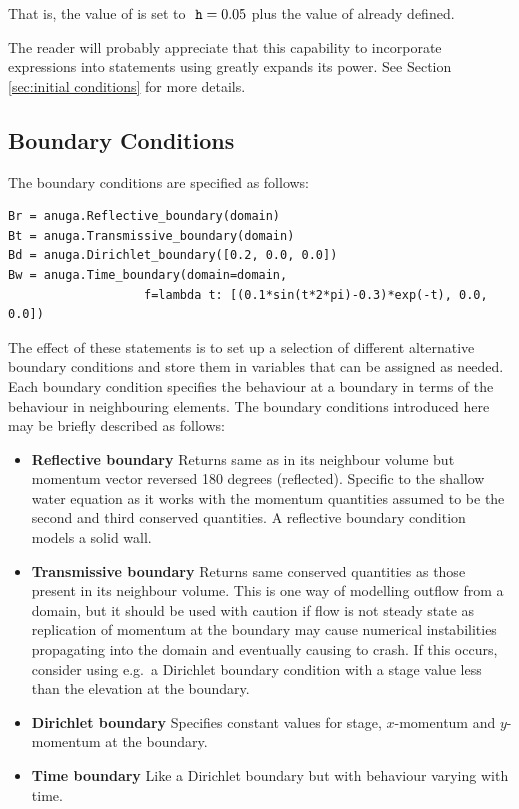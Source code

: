 \documentclass{manual}
\begin{document}
That is, the value of  is set to $\code{h} = 0.05$ plus
the value of  already defined.

The reader will probably appreciate that this capability to
incorporate expressions into statements using 
greatly expands its power. See Section \ref{sec:initial conditions} for more
details.

\subsection{Boundary Conditions}

The boundary conditions are specified as follows:

\begin{verbatim}
Br = anuga.Reflective_boundary(domain)
Bt = anuga.Transmissive_boundary(domain)
Bd = anuga.Dirichlet_boundary([0.2, 0.0, 0.0])
Bw = anuga.Time_boundary(domain=domain,
                   f=lambda t: [(0.1*sin(t*2*pi)-0.3)*exp(-t), 0.0, 0.0])
\end{verbatim}

The effect of these statements is to set up a selection of different
alternative boundary conditions and store them in variables that can be
assigned as needed. Each boundary condition specifies the
behaviour at a boundary in terms of the behaviour in neighbouring
elements. The boundary conditions introduced here may be briefly described as
follows:
\begin{itemize}
    \item \textbf{Reflective boundary}\label{def:reflective boundary}
          Returns same  as in its neighbour volume but momentum
          vector reversed 180 degrees (reflected).
          Specific to the shallow water equation as it works with the
          momentum quantities assumed to be the second and third conserved
          quantities. A reflective boundary condition models a solid wall.
    \item \textbf{Transmissive boundary}\label{def:transmissive boundary} 
          Returns same conserved quantities as
          those present in its neighbour volume. This is one way of modelling
          outflow from a domain, but it should be used with caution if flow is
          not steady state as replication of momentum at the boundary
          may cause numerical instabilities propagating into the domain and 
          eventually causing \anuga to crash. If this occurs,
          consider using e.g.\ a Dirichlet boundary condition with a stage value 
          less than the elevation at the boundary.
    \item \textbf{Dirichlet boundary}\label{def:dirichlet boundary} Specifies
          constant values for stage, $x$-momentum and $y$-momentum at the boundary.
    \item \textbf{Time boundary}\label{def:time boundary} Like a Dirichlet
          boundary but with behaviour varying with time.
\end{itemize}
\end{document}
